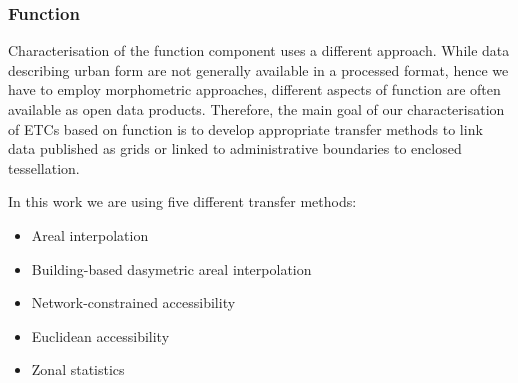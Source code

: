 \subsubsection*{Function}
Characterisation of the function component uses a different approach. While data
describing urban form are not generally available in a processed format, hence we have
to employ morphometric approaches, different aspects of function are often available as
open data products. Therefore, the main goal of our characterisation of ETCs based on
function is to develop appropriate transfer methods to link data published as grids or
linked to administrative boundaries to enclosed tessellation.

In this work we are using five different transfer methods:

\begin{itemize}
    \item Areal interpolation
    \item Building-based dasymetric areal interpolation
    \item Network-constrained accessibility
    \item Euclidean accessibility
    \item Zonal statistics
\end{itemize}

